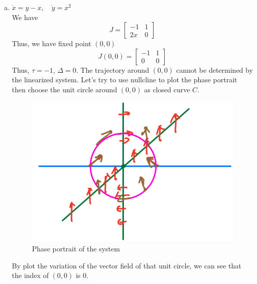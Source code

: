 \documentclass[12pt]{exam}
\begin{document}
\begin{enumerate}[(a)]
	\item $\dot{x} = y-x, \quad \dot{y}=x^2$ \\
		We have
		\[ J = \begin{bmatrix} -1 & 1 \\ 2x & 0 \end{bmatrix} \]
		Thus, we have fixed point $(0, 0)$
		\[ J(0, 0) = \begin{bmatrix} -1 & 1 \\ 0 & 0 \end{bmatrix} \]
		Thus, $\tau = -1$, $\Delta = 0$. The trajectory around $(0, 0)$ cannot be determined by the linearized system. Let's try to use nullcline to plot the phase portrait then choose the unit circle around $(0, 0)$ as closed curve $C$. 
		\begin{figure}[H]
			\centering
			\includegraphics[width=0.7\linewidth]{3a.jpg}
			\caption{Phase portrait of the system}
		\end{figure}
		
		By plot the variation of the vector field of that unit circle, we can see that the index of $(0, 0)$ is $0$.


\end{enumerate}
\end{document}
